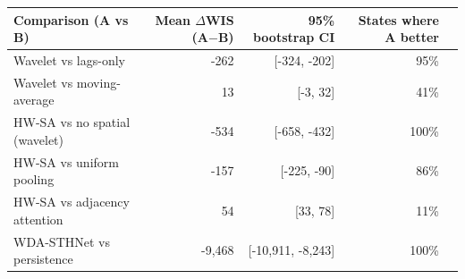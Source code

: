 \begin{tabular}{lrrrr}
\toprule
Comparison (A vs B) & Mean $\Delta$WIS (A$-$B) & 95\% bootstrap CI & States where A better \\
\midrule
Wavelet vs lags-only & -262 & [-324, -202] & 95\% \\
Wavelet vs moving-average & 13 & [-3, 32] & 41\% \\
HW-SA vs no spatial (wavelet) & -534 & [-658, -432] & 100\% \\
HW-SA vs uniform pooling & -157 & [-225, -90] & 86\% \\
HW-SA vs adjacency attention & 54 & [33, 78] & 11\% \\
WDA-STHNet vs persistence & -9,468 & [-10,911, -8,243] & 100\% \\
\bottomrule
\end{tabular}

